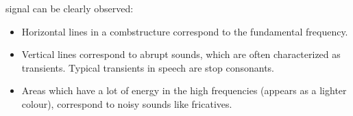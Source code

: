\documentclass[letterpaper,10pt,english]{jupyterBook}
\begin{document}
signal can be clearly observed:
\begin{itemize}
\item {} 
\sphinxAtStartPar
Horizontal lines in a comb\sphinxhyphen{}structure correspond to the fundamental
frequency.

\item {} 
\sphinxAtStartPar
Vertical lines correspond to abrupt sounds, which are often
characterized as transients. Typical transients in speech are stop
consonants.

\item {} 
\sphinxAtStartPar
Areas which have a lot of energy in the high frequencies (appears as
a lighter colour), correspond to noisy sounds like fricatives.

\end{itemize}
\end{document}
